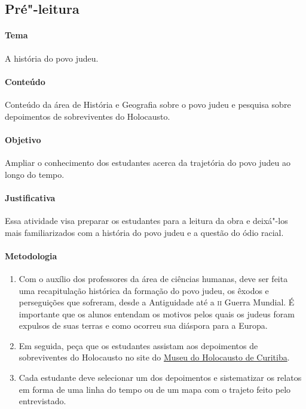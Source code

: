 \documentclass[12pt]{extarticle}
\begin{document}
\begin{comment}Além das
habilidades de Linguagens e suas Tecnologias e de Língua Portuguesa,
indicadas nas etapas da seção anterior e válidas também para esta,
listamos a seguir as habilidades de outras áreas, presentes na abordagem
interdisciplinar:
\end{comment}

\subsection{Pré"-leitura}

\paragraph{Tema} A história do povo judeu.

\paragraph{Conteúdo} Conteúdo da área de História e Geografia sobre o povo judeu
e pesquisa sobre depoimentos de sobreviventes do Holocausto.

\paragraph{Objetivo} Ampliar o conhecimento dos estudantes acerca da trajetória
do povo judeu ao longo do tempo.

\paragraph{Justificativa} Essa atividade visa preparar os estudantes para
a leitura da obra e deixá"-los mais familiarizados com a história do povo 
judeu e a questão do ódio racial.

\paragraph{Metodologia}

\begin{enumerate}

\item Com o auxílio dos professores da área de ciências humanas,
deve ser feita uma recapitulação histórica da formação do povo judeu, 
os êxodos e perseguições
que sofreram, desde a Antiguidade até a \textsc{ii} Guerra Mundial. 
É importante que os alunos entendam os motivos pelos quais os judeus 
foram expulsos de suas terras e como ocorreu sua diáspora para a Europa. 

\item Em seguida, peça que os estudantes assistam aos depoimentos 
de sobreviventes do Holocausto no site 
do \href{https://www.museudoholocausto.org.br/depoimentos/}{Museu do Holocausto de Curitiba}.

\item Cada estudante deve selecionar um dos depoimentos e 
sistematizar os relatos em forma de uma linha do tempo 
ou de um mapa com o trajeto feito pelo entrevistado.

\end{enumerate}
\end{document}
